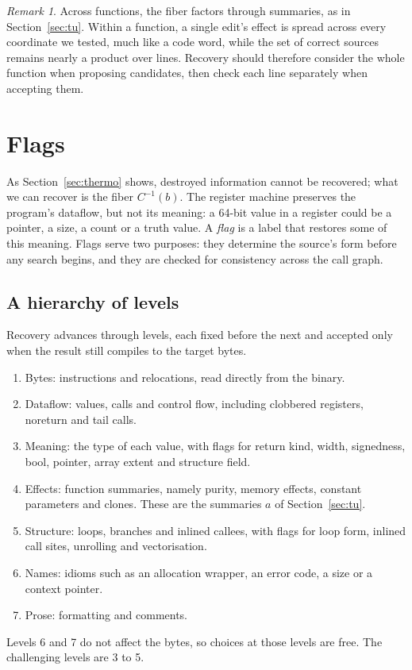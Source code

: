 \documentclass[11pt]{article}
\theoremstyle{definition}
\theoremstyle{remark}
\newtheorem{remark}[theorem]{Remark}
\begin{document}
\begin{remark}
Across functions, the fiber factors through summaries, as in Section~\ref{sec:tu}. Within a function, a single edit's effect is spread across every coordinate we tested, much like a code word, while the set of correct sources remains nearly a product over lines. Recovery should therefore consider the whole function when proposing candidates, then check each line separately when accepting them.
\end{remark}

\section{Flags}

As Section~\ref{sec:thermo} shows, destroyed information cannot be recovered; what we can recover is the fiber $C^{-1}(b)$. The register machine preserves the program's dataflow, but not its meaning: a 64-bit value in a register could be a pointer, a size, a count or a truth value. A \emph{flag} is a label that restores some of this meaning. Flags serve two purposes: they determine the source's form before any search begins, and they are checked for consistency across the call graph.

\subsection{A hierarchy of levels}

Recovery advances through levels, each fixed before the next and accepted only when the result still compiles to the target bytes.
\begin{enumerate}
  \item Bytes: instructions and relocations, read directly from the binary.
  \item Dataflow: values, calls and control flow, including clobbered registers, noreturn and tail calls.
  \item Meaning: the type of each value, with flags for return kind, width, signedness, bool, pointer, array extent and structure field.
  \item Effects: function summaries, namely purity, memory effects, constant parameters and clones. These are the summaries $a$ of Section~\ref{sec:tu}.
  \item Structure: loops, branches and inlined callees, with flags for loop form, inlined call sites, unrolling and vectorisation.
  \item Names: idioms such as an allocation wrapper, an error code, a size or a context pointer.
  \item Prose: formatting and comments.
\end{enumerate}
Levels 6 and 7 do not affect the bytes, so choices at those levels are free. The challenging levels are 3 to 5.
\end{document}
